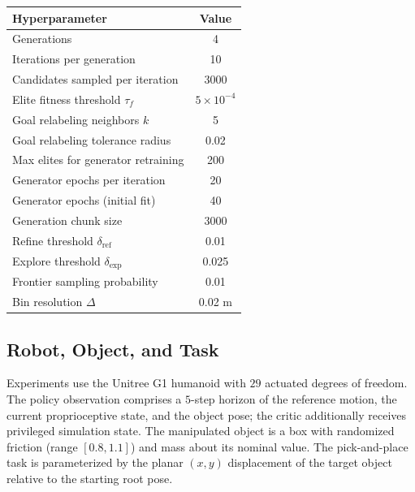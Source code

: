 \documentclass{article}
\begin{document}
\begin{center}
\begin{tabular}{lc}
\toprule
\textbf{Hyperparameter} & \textbf{Value} \\
\midrule
Generations & 4 \\
Iterations per generation & 10 \\
Candidates sampled per iteration & 3000 \\
Elite fitness threshold $\tau_f$ & $5 \times 10^{-4}$ \\
Goal relabeling neighbors $k$ & 5 \\
Goal relabeling tolerance radius & 0.02 \\
Max elites for generator retraining & 200 \\
Generator epochs per iteration & 20 \\
Generator epochs (initial fit) & 40 \\
Generation chunk size & 3000 \\
\midrule
Refine threshold $\delta_\text{ref}$ & 0.01 \\
Explore threshold $\delta_\text{exp}$ & 0.025 \\
Frontier sampling probability & 0.01 \\
Bin resolution $\Delta$ & 0.02 m \\
\bottomrule
\end{tabular}
\end{center}

\subsection{Robot, Object, and Task}
\label{app:robot}

Experiments use the Unitree G1 humanoid with $29$ actuated degrees of freedom. The policy observation comprises a $5$-step horizon of the reference motion, the current proprioceptive state, and the object pose; the critic additionally receives privileged simulation state. The manipulated object is a box with randomized friction (range $[0.8, 1.1]$) and mass about its nominal value. The pick-and-place task is parameterized by the planar $(x, y)$ displacement of the target object relative to the starting root pose.
\end{document}
